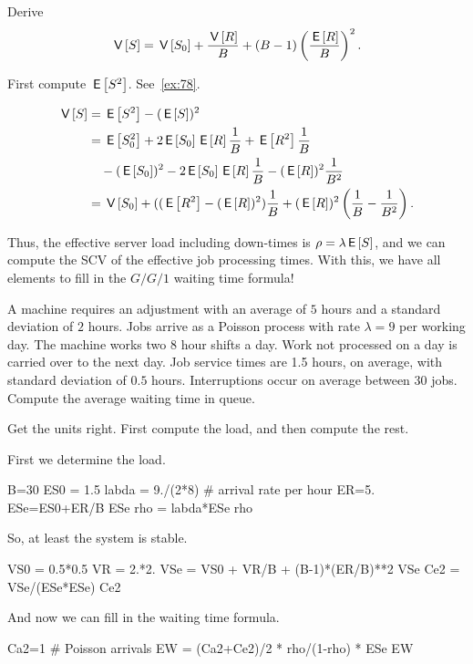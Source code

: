 \begin{exercise}
Derive 
\begin{equation}\label{eq:89} 
 \,\mathsf{V}\left[S\right] = \,\mathsf{V}\left[S_0\right] + \frac{\,\mathsf{V}\left[R\right]} B + (B-1)\left(\frac{\,\mathsf{E}\left[R\right]}{B}\right)^2.
\end{equation}
\begin{hint}
 First compute $\,\mathsf{E}\left[S^2\right]$. See~\cref{ex:78}.
\end{hint}
\begin{solution}
 \begin{equation*}
 \begin{split}
\,\mathsf{V}\left[S\right] 
&=\,\mathsf{E}\left[S^2\right] - (\,\mathsf{E}\left[S\right])^2 \\
&= \,\mathsf{E}\left[S_0^2\right] + 2 \,\mathsf{E}\left[S_0\right] \,\mathsf{E}\left[R\right]\frac 1B + \,\mathsf{E}\left[R^2\right]\frac 1B \\
&\quad - (\,\mathsf{E}\left[S_0\right])^2 - 2\,\mathsf{E}\left[S_0\right]\,\mathsf{E}\left[R\right] \frac 1 B - (\,\mathsf{E}\left[R\right])^2\frac1{B^2}\\
&= \,\mathsf{V}\left[S_0\right] + ((\,\mathsf{E}\left[R^2\right] - (\,\mathsf{E}\left[R\right])^2)\frac 1 B + (\,\mathsf{E}\left[R\right])^2\left(\frac 1B - \frac 1{B^2}\right).
 \end{split}
 \end{equation*}
\end{solution}
\end{exercise}


Thus, the effective server load including down-times is $\rho = \lambda \,\mathsf{E}\left[S\right]$, and we can compute the SCV of the effective job processing times.
With this, we have all elements to fill in the $G/G/1$ waiting time formula!


\begin{exercise}
 A machine requires an adjustment with an average of $5$ hours and a standard deviation of $2$ hours.
 Jobs arrive as a Poisson process with rate $\lambda=9$ per working day.
 The machine works two $8$ hour shifts a day.
 Work not processed on a day is carried over to the next day.
 Job service times are 1.5 hours, on average, with standard deviation of $0.5$ hours.
 Interruptions occur on average between $30$ jobs.
 Compute the average waiting time in queue.
\begin{hint}
 Get the units right. First compute the load, and then compute the rest.
\end{hint}
\begin{solution}
 First we determine the load. 
 \begin{pyconsole}
B=30
ES0 = 1.5
labda = 9./(2*8) # arrival rate per hour
ER=5.
ESe=ES0+ER/B
ESe
rho = labda*ESe
rho
 \end{pyconsole}
So, at least the system is stable.

\begin{pyconsole}
VS0 = 0.5*0.5
VR = 2.*2.
VSe = VS0 + VR/B + (B-1)*(ER/B)**2
VSe
Ce2 = VSe/(ESe*ESe)
Ce2
\end{pyconsole}

And now we can fill in the waiting time formula.
\begin{pyconsole}
Ca2=1 # Poisson arrivals
EW = (Ca2+Ce2)/2 * rho/(1-rho) * ESe
EW 
\end{pyconsole}
\end{solution}
\end{exercise}


